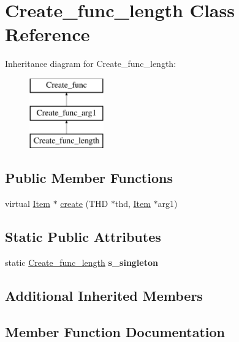 \hypertarget{classCreate__func__length}{}\section{Create\+\_\+func\+\_\+length Class Reference}
\label{classCreate__func__length}
Inheritance diagram for Create\+\_\+func\+\_\+length\+:\begin{figure}[H]
\begin{center}
\leavevmode
\includegraphics[height=3.000000cm]{classCreate__func__length}
\end{center}
\end{figure}
\subsection*{Public Member Functions}
\begin{DoxyCompactItemize}
\item 
virtual \mbox{\hyperlink{classItem}{Item}} $\ast$ \mbox{\hyperlink{classCreate__func__length_ad6f9b4efe2483c26386663dad3a0274a}{create}} (T\+HD $\ast$thd, \mbox{\hyperlink{classItem}{Item}} $\ast$arg1)
\end{DoxyCompactItemize}
\subsection*{Static Public Attributes}
\begin{DoxyCompactItemize}
\item 
\mbox{\label{classCreate__func__length_a7a841e79e6bb974a0f8270aa38c91e17}} 
static \mbox{\hyperlink{classCreate__func__length}{Create\+\_\+func\+\_\+length}} {\bfseries s\+\_\+singleton}
\end{DoxyCompactItemize}
\subsection*{Additional Inherited Members}


\subsection{Member Function Documentation}
\mbox{\label{classCreate__func__length_ad6f9b4efe2483c26386663dad3a0274a}} 
